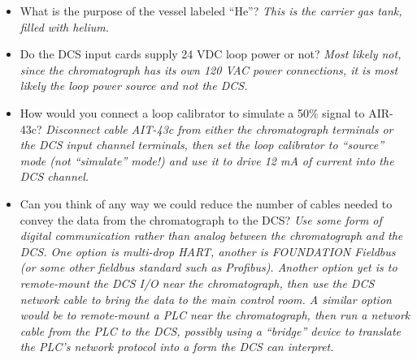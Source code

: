 \begin{itemize}
\item{} What is the purpose of the vessel labeled ``He''? {\it This is the carrier gas tank, filled with helium.}
\vskip 10pt
\item{} Do the DCS input cards supply 24 VDC loop power or not? {\it Most likely not, since the chromatograph has its own 120 VAC power connections, it is most likely the loop power source and not the DCS.}
\vskip 10pt
\item{} How would you connect a loop calibrator to simulate a 50\% signal to AIR-43c? {\it Disconnect cable AIT-43c from either the chromatograph terminals or the DCS input channel terminals, then set the loop calibrator to ``source'' mode (not ``simulate'' mode!) and use it to drive 12 mA of current into the DCS channel.}
\vskip 10pt
\item{} Can you think of any way we could reduce the number of cables needed to convey the data from the chromatograph to the DCS? {\it Use some form of digital communication rather than analog between the chromatograph and the DCS.  One option is multi-drop HART, another is FOUNDATION Fieldbus (or some other fieldbus standard such as Profibus).  Another option yet is to remote-mount the DCS I/O near the chromatograph, then use the DCS network cable to bring the data to the main control room.  A similar option would be to remote-mount a PLC near the chromatograph, then run a network cable from the PLC to the DCS, possibly using a ``bridge'' device to translate the PLC's network protocol into a form the DCS can interpret.}
\end{itemize}










